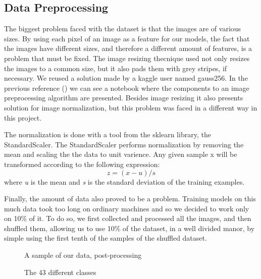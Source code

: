 \documentclass[12pt]{article}
\begin{document}
\subsection{Data Preprocessing}
\label{subsection.data_preprocessing}
    \par
        The biggest problem faced with the dataset is that the images are of various sizes. By using each pixel of an image as a feature for our 
        models, the fact that the images have different sizes, and therefore a different amount of features, is a problem that must be fixed. The 
        image resizing thecnique used not only resizes the images to a common size, but it also pads them with grey stripes, if necessary. We reused a 
        solution made by a kaggle user named gauss256\cite{data_preprocessing}. In the previous reference (\cite{data_preprocessing}) we can see a 
        notebook where the components to an image preprocessing algorithm are presented. Besides image resizing it also presents solution for image 
        normalization, but this problem was faced in a different way in this project.
    \par
        The normalization is done with a tool from the sklearn library, the StandardScaler. The StandardScaler performs normalization 
        by removing the mean and scaling the the data to unit varience\cite{standardScaler}. Any given sample x will be transformed according to  
        the following expression: \[z = (x-u)/s\] where \textit{u} is the mean and \textit{s} is the standard deviation of the training examples.
    \par
        Finally, the amount of data also proved to be a problem. Training models on this much data took too long on ordinary machines and so we decided 
        to work only on 10\% of it. To do so, we first collected and processed all the images, and then shuffled them, allowing us to use 10\% of the dataset, 
        in a well divided manor, by simple using the first tenth of the samples of the shuffled dataset.

    \begin{figure}[h]
        \caption{A sample of our data, post-processing}
    \end{figure}
    \begin{figure}[h]
        \caption{The 43 different classes}
    \end{figure}

\clearpage
\end{document}
